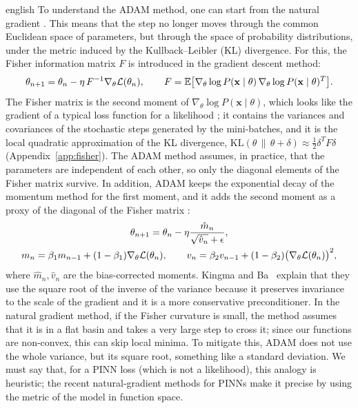 \documentclass[0000.tex]{subfiles}
\begin{document}
\begin{hyphenrules}{english}
To understand the ADAM method, one can start from the natural gradient
\cite{amari1998,pascanu2013}. This means that the step no longer moves through the common Euclidean
space of parameters, but through the space of probability distributions, under the metric induced by
the Kullback--Leibler (KL) divergence. For this, the Fisher information matrix $F$ is introduced in the
gradient descent method:
\begin{equation}
  \theta_{n+1}=\theta_n-\eta\,F^{-1}\nabla_\theta\mathcal{L}(\theta_n),\qquad
  F=\mathbb{E}\big[\nabla_\theta\log P(\mathbf{x}\mid\theta)\,\nabla_\theta\log P(\mathbf{x}\mid\theta)^{T}\big].
  \label{eq:natural-gradient}
\end{equation}
The Fisher matrix is the second moment of $\nabla_\theta\log P(\mathbf{x}\mid\theta)$, which looks like the
gradient of a typical loss function for a likelihood \cite{amari1998}; it contains the variances and
covariances of the stochastic steps generated by the mini-batches, and it is the local quadratic
approximation of the KL divergence, $\mathrm{KL}(\theta\,\|\,\theta+\delta)\approx\frac12\delta^{T}F\delta$
(Appendix~\ref{app:fisher}). The ADAM method assumes, in practice, that the parameters are independent of each
other, so only the diagonal elements of the Fisher matrix survive. In addition, ADAM keeps the exponential
decay of the momentum method \cite{ruder2016} for the first moment, and it adds the second moment as
a proxy of the diagonal of the Fisher matrix \cite{kingma2015}:
\begin{equation}
  \begin{gathered}
  \theta_{n+1}=\theta_n-\eta\frac{\hat m_n}{\sqrt{\hat v_n}+\epsilon},\\
  m_n=\beta_1m_{n-1}+(1-\beta_1)\nabla_\theta\mathcal{L}(\theta_n),\qquad
  v_n=\beta_2v_{n-1}+(1-\beta_2)\big(\nabla_\theta\mathcal{L}(\theta_n)\big)^2,
  \end{gathered}
  \label{eq:adam}
\end{equation}
where $\hat m_n,\hat v_n$ are the bias-corrected moments. Kingma and Ba~\cite{kingma2015} explain that they use the
square root of the inverse of the variance because it preserves invariance to the scale of the gradient
and it is a more conservative preconditioner. In the natural gradient method, if the Fisher curvature is
small, the method assumes that it is in a flat basin and takes a very large step to cross it; since our
functions are non-convex, this can skip local minima. To mitigate this, ADAM does not use the whole
variance, but its square root, something like a standard deviation. We must say that, for a PINN loss
(which is not a likelihood), this analogy is heuristic; the recent natural-gradient methods for PINNs
\cite{schwencke2025anagram,schwencke2025thesis} make it precise by using the metric of the model in
function space.


\end{hyphenrules}
\end{document}
